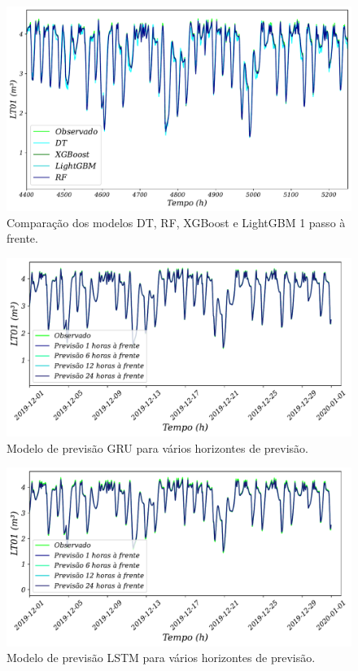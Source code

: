 \begin{figure}[!htb]
	\centering
	\caption{Comparação dos modelos DT, RF, XGBoost e LightGBM 1 passo à frente.}
	\label{fig:lr-xgb-lgbm-rf}
	\includegraphics[width=0.7\linewidth]{Resultados/Figuras/LR-XGB-LGBM-RF}
	
\end{figure}

\begin{figure}[!htb]
	\centering
	\caption{Modelo de previsão GRU para vários horizontes de previsão.}
	\label{fig:gru1}
	\includegraphics[width=0.7\linewidth]{Resultados/Figuras/GRU}
	
\end{figure}

\begin{figure}[!htb]
	\centering
	\caption{Modelo de previsão LSTM para vários horizontes de previsão.}
	\label{fig:lstm}
	\includegraphics[width=0.7\linewidth]{Resultados/Figuras/LSTM}
	
\end{figure}


